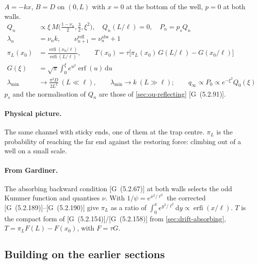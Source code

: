 \documentclass[11pt]{article}
\numberwithin{equation}{section}
\newcommand{\dd}{\mathrm{d}}
\newcommand{\G}[1]{[G~(#1)]}
\begin{document}
\begin{keyresults}
$A=-kx$, $B=D$ on $(0,L)$ with $x=0$ at the bottom of the well, $p=0$ at both walls.
\begin{align}
  Q_n &\propto \xi\,M\bigl(\tfrac{1-\nu_n}2,\tfrac32,\xi^2\bigr),\quad Q_n(L/\ell)=0,\quad P_n=p_sQ_n \\
  \lambda_n &= \nu_nk,\qquad \nu_{n+1}^{\text{refl}}=\nu_n^{\text{abs}}+1 \\
  \pi_L(x_0) &= \frac{\operatorname{erfi}(x_0/\ell)}{\operatorname{erfi}(L/\ell)},\qquad
  T(x_0)=\tau\bigl[\pi_L(x_0)\,G(L/\ell)-G(x_0/\ell)\bigr] \\
  G(\xi) &= \sqrt\pi\int_0^\xi e^{u^2}\operatorname{erf}(u)\,\dd u \\
  \lambda_{\min} &\to \frac{\pi^2D}{2L^2}\ (L\ll\ell),\qquad \lambda_{\min}\to k\ (L\gg\ell);\qquad
  q_\infty\propto P_0\propto e^{-\xi^2}Q_0(\xi)
\end{align}
$p_s$ and the normalisation of $Q_n$ are those of \cref{sec:ou-reflecting} \G{5.2.91}.
\end{keyresults}

\paragraph{Physical picture.} The same channel with sticky ends, one of them at the trap centre. $\pi_L$ is
the probability of reaching the far end against the restoring force: climbing out of a well on a small scale.

\paragraph{From Gardiner.} The absorbing backward condition \G{5.2.67} at both walls selects the odd Kummer
function and quantises $\nu$. With $1/\psi=e^{x^2/\ell^2}$ the corrected \G{5.2.189}--\G{5.2.190} give $\pi_L$
as a ratio of $\int_0^xe^{y^2/\ell^2}\dd y\propto\operatorname{erfi}(x/\ell)$. $T$ is the compact form of
\G{5.2.154}/\G{5.2.158} from \cref{sec:drift-absorbing}, $T=\pi_LF(L)-F(x_0)$, with $F=\tau G$.

\subsection{Building on the earlier sections}
\end{document}
